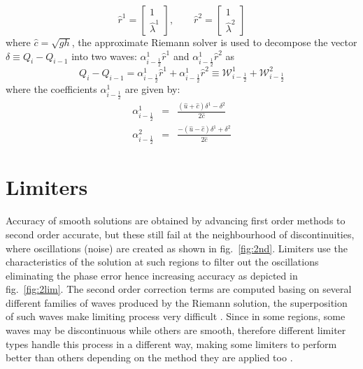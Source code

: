 \documentclass[12pt,a4paper]{article}
\begin{document}
	\begin{equation}
		\hat{r}^1 =  \begin{bmatrix} 1 \\ 	\hat{\lambda}^1 \end{bmatrix}, \qquad 	\hat{r}^2 =  
		\begin{bmatrix} 1 \\ 	\hat{\lambda}^2 \end{bmatrix}
		\label{vec}
	\end{equation}
	where $\hat{c} = \sqrt{gh}$, the approximate Riemann solver is used to decompose the vector  $ \delta \equiv Q_{i} - Q_{i-1}$ into two waves: $\alpha_{i-\frac{1}{2}}^{1} \hat{r}^1$ and $\alpha_{i-\frac{1}{2}}^{1} \hat{r}^2$ as 
	\begin{equation}
		Q_{i} - Q_{i-1} = \alpha_{i-\frac{1}{2}}^{1} \hat{r}^1 + \alpha_{i-\frac{1}{2}}^{1} \hat{r}^2 \equiv \mathcal{W}_{i-\frac{1}{2}}^{1} + \mathcal{W}_{i-\frac{1}{2}}^{2}
	\end{equation}
	where the coefficients $\alpha_{i-\frac{1}{2}}^{1}$ are given by:
	\begin{eqnarray}
		\alpha_{i-\frac{1}{2}}^{1} &=& \frac{(\hat{u} + \hat{c})\delta^{1} - \delta^2}{2\hat{c}}\\
		\alpha_{i-\frac{1}{2}}^{2} &=& \frac{-(\hat{u} - \hat{c})\delta^{1} + \delta^2}{2\hat{c}}
	\end{eqnarray}
	
	\section{Limiters}
	Accuracy of smooth solutions are obtained by advancing first order methods to second order accurate, but these still fail at the neighbourhood of discontinuities, where oscillations (noise) are created as shown in fig.~\ref{fig:2nd}. Limiters use the characteristics of the solution at such regions to filter out the oscillations eliminating the phase error hence increasing accuracy as depicted in fig.~\ref{fig:2lim}. The second order correction terms are computed basing on several different families of waves produced by the Riemann solution, the superposition of such waves make limiting process very difficult \cite{ge:2011} .  Since in some regions, some waves may be discontinuous while others are smooth, therefore different limiter types handle this process in a different way, making some limiters to perform better than others depending on the method they are applied too \cite{be-ge-le-ma:2011}.\\
	
\end{document}
